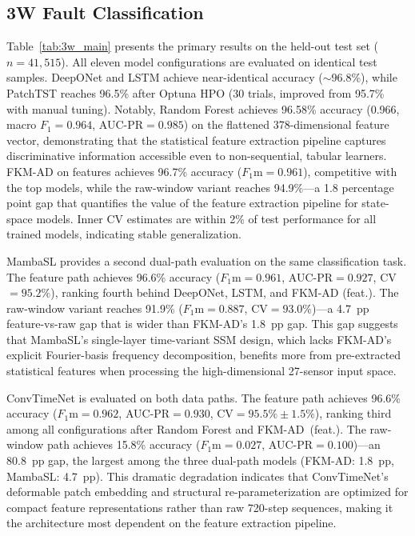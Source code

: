 \documentclass[conference]{IEEEtran}
\begin{document}
\subsection{3W Fault Classification}

Table~\ref{tab:3w_main} presents the primary results on the held-out test set ($n{=}41{,}515$). All eleven model configurations are evaluated on identical test samples. DeepONet and LSTM achieve near-identical accuracy ($\sim$96.8\%), while PatchTST reaches 96.5\% after Optuna HPO (30 trials, improved from 95.7\% with manual tuning). Notably, Random Forest achieves 96.58\% accuracy (0.966, macro $F_1{=}0.964$, AUC-PR${=}0.985$) on the flattened 378-dimensional feature vector, demonstrating that the statistical feature extraction pipeline captures discriminative information accessible even to non-sequential, tabular learners. FKM-AD on features achieves 96.7\% accuracy ($F_1$m${=}0.961$), competitive with the top models, while the raw-window variant reaches 94.9\%---a 1.8 percentage point gap that quantifies the value of the feature extraction pipeline for state-space models. Inner CV estimates are within 2\% of test performance for all trained models, indicating stable generalization.

MambaSL \cite{mambasl} provides a second dual-path evaluation on the same classification task. The feature path achieves 96.6\% accuracy ($F_1$m${=}0.961$, AUC-PR${=}0.927$, CV${=}95.2\%$), ranking fourth behind DeepONet, LSTM, and FKM-AD (feat.). The raw-window variant reaches 91.9\% ($F_1$m${=}0.887$, CV${=}93.0\%$)---a 4.7~pp feature-vs-raw gap that is wider than FKM-AD's 1.8~pp gap. This gap suggests that MambaSL's single-layer time-variant SSM design, which lacks FKM-AD's explicit Fourier-basis frequency decomposition, benefits more from pre-extracted statistical features when processing the high-dimensional 27-sensor input space.

ConvTimeNet \cite{convtimenet} is evaluated on both data paths. The feature path achieves 96.6\% accuracy ($F_1$m${=}0.962$, AUC-PR${=}0.930$, CV${=}95.5\%\pm1.5\%$), ranking third among all configurations after Random Forest and FKM-AD~(feat.). The raw-window path achieves 15.8\% accuracy ($F_1$m${=}0.027$, AUC-PR${=}0.100$)---an 80.8~pp gap, the largest among the three dual-path models (FKM-AD: 1.8~pp, MambaSL: 4.7~pp). This dramatic degradation indicates that ConvTimeNet's deformable patch embedding and structural re-parameterization are optimized for compact feature representations rather than raw 720-step sequences, making it the architecture most dependent on the feature extraction pipeline.
\end{document}
